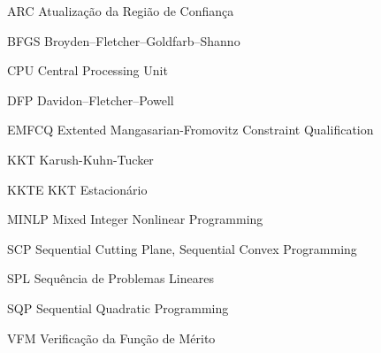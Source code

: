 
\begin{siglas}
\item[ARC] Atualização da Região de Confiança
\item[BFGS] Broyden–Fletcher–Goldfarb–Shanno
\item[CPU] Central Processing Unit
\item [DFP] Davidon–Fletcher–Powell
\item[EMFCQ] Extented Mangasarian-Fromovitz Constraint Qualification
\item[KKT] Karush-Kuhn-Tucker
\item[KKTE] KKT Estacionário
\item[MINLP] Mixed Integer Nonlinear Programming
\item[SCP] Sequential Cutting Plane, Sequential Convex Programming
\item[SPL] Sequência de Problemas Lineares
\item[SQP] Sequential Quadratic Programming
\item[VFM] Verificação da Função de Mérito
\end{siglas}

